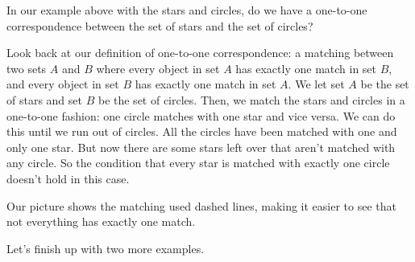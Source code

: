 \documentclass{ximera}
\begin{document}
\begin{question}
In our example above with the stars and circles, do we have a one-to-one correspondence between the set of stars and the set of circles?
\begin{center}
\end{center}
\begin{multipleChoice}
\end{multipleChoice}
\begin{explanation}
	Look back at our definition of one-to-one correspondence: a matching between two sets $A$ and $B$ where every object in set $A$ has exactly one match in set $B$, and every object in set $B$ has exactly one match in set $A$. We let set $A$ be the set of stars and set $B$ be the set of circles. Then, we match the stars and circles in a one-to-one fashion: one circle matches with one star and vice versa. We can do this until we run out of circles. All the circles have been matched with one and only one star. But now there are some stars left over that aren't matched with any circle. So the condition that every star is matched with exactly one circle doesn't hold in this case.
\begin{center}
\end{center}
Our picture shows the matching used dashed lines, making it easier to see that not everything has exactly one match.
\end{explanation}
\end{question}

Let's finish up with two more examples.
\end{document}
